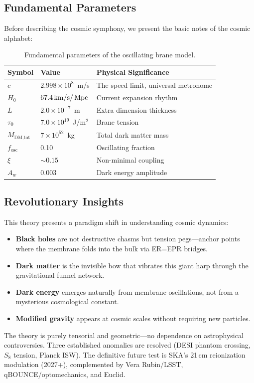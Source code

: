 \subsection*{Fundamental Parameters}

Before describing the cosmic symphony, we present the basic notes of the cosmic alphabet:

\begin{table}[h]
\centering
\caption{Fundamental parameters of the oscillating brane model.}
\label{tab:fundamental_params}
\begin{tabular}{@{}lll@{}}
\toprule
\textbf{Symbol} & \textbf{Value} & \textbf{Physical Significance} \\
\midrule
$c$ & $2.998 \times 10^8$~m/s & The speed limit, universal metronome \\
$H_0$ & $67.4\,\text{km/s}/\,\text{Mpc}$ & Current expansion rhythm \\
$L$ & $2.0 \times 10^{-7}$~m & Extra dimension thickness \\
$\tau_0$ & $7.0 \times 10^{19}$~J/m$^2$ & Brane tension \\
$M_\text{DM,tot}$ & $7 \times 10^{52}$~kg & Total dark matter mass \\
$f_\text{osc}$ & 0.10 & Oscillating fraction \\
$\xi$ & $\sim 0.15$ & Non-minimal coupling \\
$A_w$ & 0.003 & Dark energy amplitude \\
\bottomrule
\end{tabular}
\end{table}

\subsection*{Revolutionary Insights}

This theory presents a paradigm shift in understanding cosmic dynamics:

\begin{itemize}
  \item \textbf{Black holes} are not destructive chasms but tension pegs---anchor points where the membrane folds into the bulk via ER=EPR bridges.
  \item \textbf{Dark matter} is the invisible bow that vibrates this giant harp through the gravitational funnel network.
  \item \textbf{Dark energy} emerges naturally from membrane oscillations, not from a mysterious cosmological constant.
  \item \textbf{Modified gravity} appears at cosmic scales without requiring new particles.
\end{itemize}

The theory is purely tensorial and geometric---no dependence on astrophysical controversies. Three established anomalies are resolved (DESI phantom crossing, $S_8$ tension, Planck ISW). The definitive future test is SKA's 21\,cm reionization modulation (2027+), complemented by Vera Rubin/LSST, qBOUNCE/optomechanics, and Euclid.

\newpage
